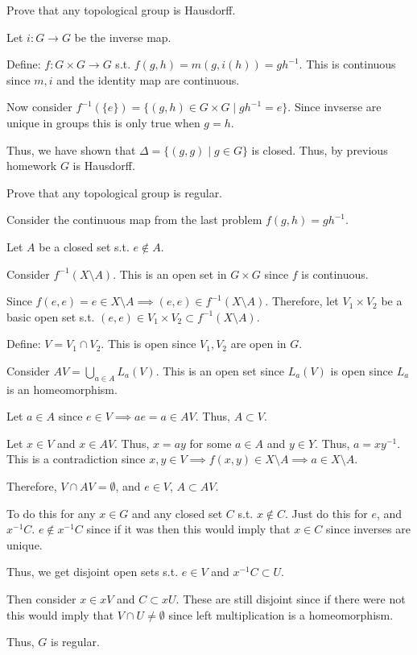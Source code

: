 \documentclass[12pt, letterpaper]{article}
\begin{document}
\begin{subproblem}{}
    Prove that any topological group is Hausdorff.
\end{subproblem}
\begin{problemproof}
    Let $i : G \to G$ be the inverse map.

    Define: $f : G \times G \to G$ s.t. $f(g,h)=m(g,i(h))=gh^{-1}$. This is continuous since $m,i$ and the identity map are continuous.

    Now consider $f^{-1}(\{e\})=\{(g,h) \in G \times G \mid gh^{-1}=e\}$. Since invserse are unique in groups this is only true when $g=h$.

    Thus, we have shown that $\Delta=\{(g,g) \mid g \in G\}$ is closed. Thus, by previous homework $G$ is Hausdorff.
\end{problemproof}

\begin{subproblem}{}
    Prove that any topological group is regular.
\end{subproblem}
\begin{problemproof}
    Consider the continuous map from the last problem $f(g,h)=gh^{-1}$.

    Let $A$ be a closed set s.t. $e \notin A$.

    Consider $f^{-1}(X \setminus A)$. This is an open set in $G \times G$ since $f$ is continuous.

    Since $f(e,e)=e \in X \setminus A \implies (e,e) \in f^{-1}(X \setminus A)$. Therefore, let $V_1 \times V_2$ be a basic open set s.t. $(e,e) \in V_1 \times V_2 \subset f^{-1}(X \setminus A)$.

    Define: $V=V_1 \cap V_2$. This is open since $V_1,V_2$ are open in $G$.

    Consider $AV=\displaystyle\bigcup_{a \in A}L_a(V)$. This is an open set since $L_a(V)$ is open since $L_a$ is an homeomorphism.

    Let $a \in A$ since $e \in V \implies ae=a \in AV$. Thus, $A \subset V$.

    Let $x \in V$ and $x \in AV$. Thus, $x=ay$ for some $a \in A$ and $y \in Y$. Thus, $a=xy^{-1}$. This is a contradiction since $x,y \in V \implies f(x,y) \in X \setminus A \implies a \in X \setminus A$.

    Therefore, $V \cap AV = \emptyset$, and $e \in V$, $A \subset AV$.

    To do this for any $x \in G$ and any closed set $C$ s.t. $x \notin C$. Just do this for $e$, and $x^{-1}C$. $e \notin x^{-1}C$ since if it was then this would imply that $x \in C$ since inverses are unique.

    Thus, we get disjoint open sets s.t. $e \in V$ and $x^{-1}C \subset U$.

    Then consider $x \in xV$ and $C \subset xU$. These are still disjoint since if there were not this would imply that $V \cap U \neq \emptyset$ since left multiplication is a homeomorphism.

    Thus, $G$ is regular.
\end{problemproof}
\end{document}
